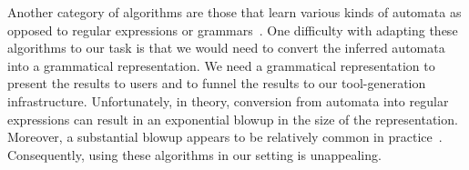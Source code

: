 

Another category of algorithms are those that learn various kinds of
automata as opposed to regular expressions or 
grammars~\cite{rpni,denis:learning-regular-languages,raeymaekers+:learning-tree-languages}.  
One difficulty with adapting these algorithms to our task is that 
we would need to convert the inferred automata into a 
grammatical representation.  We need a grammatical representation 
to present the results to users and to funnel the results
to our tool-generation infrastructure.
Unfortunately, in theory, conversion from automata into
regular expressions can result in an exponential blowup in the
size of the representation.
Moreover, a substantial blowup appears to be relatively common in
practice~\cite{bex+:dtd-inference}.  Consequently, using these algorithms
in our setting is unappealing.



  


